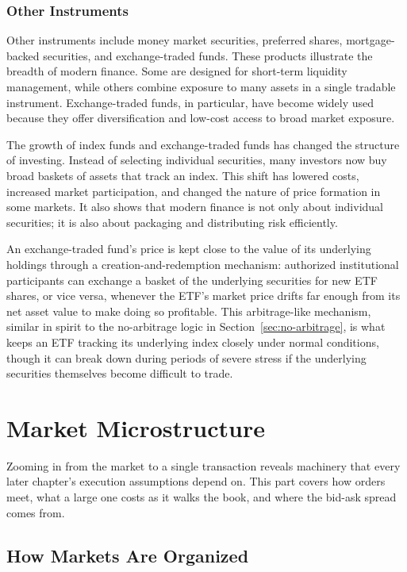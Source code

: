 \documentclass[../ai_in_finance]{subfiles}
\begin{document}
\subsubsection*{Other Instruments}

Other instruments include money market securities, preferred shares, mortgage-backed securities, and exchange-traded funds. These products illustrate the breadth of modern finance. Some are designed for short-term liquidity management, while others combine exposure to many assets in a single tradable instrument. Exchange-traded funds, in particular, have become widely used because they offer diversification and low-cost access to broad market exposure.

The growth of index funds and exchange-traded funds has changed the structure of investing. Instead of selecting individual securities, many investors now buy broad baskets of assets that track an index. This shift has lowered costs, increased market participation, and changed the nature of price formation in some markets. It also shows that modern finance is not only about individual securities; it is also about packaging and distributing risk efficiently.

An exchange-traded fund's price is kept close to the value of its underlying holdings through a creation-and-redemption mechanism: authorized institutional participants can exchange a basket of the underlying securities for new ETF shares, or vice versa, whenever the ETF's market price drifts far enough from its net asset value to make doing so profitable. This arbitrage-like mechanism, similar in spirit to the no-arbitrage logic in Section~\ref{sec:no-arbitrage}, is what keeps an ETF tracking its underlying index closely under normal conditions, though it can break down during periods of severe stress if the underlying securities themselves become difficult to trade.

\section{Market Microstructure}

Zooming in from the market to a single transaction reveals machinery that every later chapter's execution assumptions depend on. This part covers how orders meet, what a large one costs as it walks the book, and where the bid-ask spread comes from.

\subsection{How Markets Are Organized}
\end{document}
